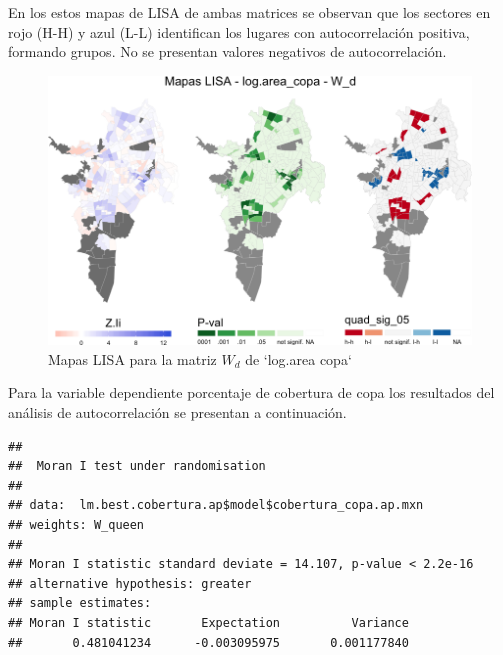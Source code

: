 \documentclass[12pt,]{book}
\newenvironment{Shaded}{\begin{snugshade}}{\end{snugshade}}
\newcommand{\KeywordTok}[1]{\textcolor[rgb]{0.13,0.29,0.53}{\textbf{#1}}}
\newcommand{\DataTypeTok}[1]{\textcolor[rgb]{0.13,0.29,0.53}{#1}}
\newcommand{\OtherTok}[1]{\textcolor[rgb]{0.56,0.35,0.01}{#1}}
\newcommand{\OperatorTok}[1]{\textcolor[rgb]{0.81,0.36,0.00}{\textbf{#1}}}
\newcommand{\NormalTok}[1]{#1}
\begin{document}
En los estos mapas de LISA de ambas matrices se observan que los
sectores en rojo (H-H) y azul (L-L) identifican los lugares con
autocorrelación positiva, formando grupos. No se presentan valores
negativos de autocorrelación.

\begin{figure}
\includegraphics[width=1\linewidth]{tesis-unigis_files/figure-latex/mapas-lisa-copa-wd-1} \caption{Mapas LISA para la matriz $W_d$ de `log.area copa`}\label{fig:mapas-lisa-copa-wd}
\end{figure}

Para la variable dependiente porcentaje de cobertura de copa los
resultados del análisis de autocorrelación se presentan a continuación.

\begin{Shaded}
\end{Shaded}

\begin{verbatim}
## 
##  Moran I test under randomisation
## 
## data:  lm.best.cobertura.ap$model$cobertura_copa.ap.mxn  
## weights: W_queen  
## 
## Moran I statistic standard deviate = 14.107, p-value < 2.2e-16
## alternative hypothesis: greater
## sample estimates:
## Moran I statistic       Expectation          Variance 
##       0.481041234      -0.003095975       0.001177840
\end{verbatim}

\begin{Shaded}
\end{Shaded}
\end{document}

